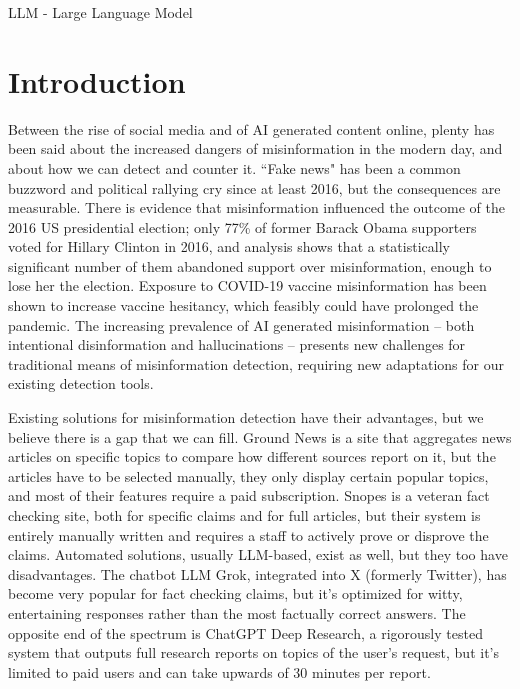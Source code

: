 \documentclass[conference]{IEEEtran}
\begin{document}
\begin{IEEEkeywords} %
LLM - Large Language Model
\end{IEEEkeywords}

\section{Introduction}
Between the rise of social media and of AI generated content online, plenty has been said about the increased dangers of misinformation in the modern day, and about how we can detect and counter it. ``Fake news" has been a common buzzword and political rallying cry since at least 2016, but the consequences are measurable. There is evidence that misinformation influenced the outcome of the 2016 US presidential election; only 77\% of former Barack Obama supporters voted for Hillary Clinton in 2016, and analysis shows that a statistically significant number of them abandoned support over misinformation, enough to lose her the election\cite{2016ElectionStats}. Exposure to COVID-19 vaccine misinformation has been shown to increase vaccine hesitancy, which feasibly could have prolonged the pandemic\cite{Loomba2021}. The increasing prevalence of AI generated misinformation -- both intentional disinformation and hallucinations -- presents new challenges for traditional means of misinformation detection, requiring new adaptations for our existing detection tools\cite{Zhou2023}.

Existing solutions for misinformation detection have their advantages, but we believe there is a gap that we can fill. Ground News is a site that aggregates news articles on specific topics to compare how different sources report on it, but the articles have to be selected manually, they only display certain popular topics, and most of their features require a paid subscription\cite{groundNews}. Snopes is a veteran fact checking site, both for specific claims and for full articles, but their system is entirely manually written and requires a staff to actively prove or disprove the claims\cite{Snopes}. Automated solutions, usually LLM-based, exist as well, but they too have disadvantages. The chatbot LLM Grok\cite{Grok4}, integrated into X (formerly Twitter), has become very popular for fact checking claims\cite{esteban_ponce_de_leon_grok_2025}, but it's optimized for witty, entertaining responses rather than the most factually correct answers\cite{xai_xai_announcing_2023}. The opposite end of the spectrum is ChatGPT Deep Research\cite{DeepResearch}, a rigorously tested system that outputs full research reports on topics of the user's request, but it's limited to paid users and can take upwards of 30 minutes per report\cite{introducingDR}.
\end{document}
